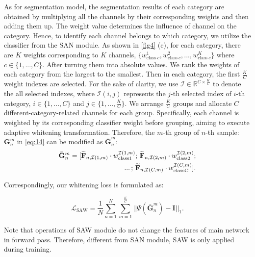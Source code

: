\documentclass[10pt,twocolumn,letterpaper]{article}
\begin{document}
As for segmentation model,  the segmentation results of each category are obtained by multiplying all the channels by their corresponding weights and then adding them up. The weight value determines the influence of channel on the category. Hence, to identify each channel belongs to which category, we utilize the classifier from the SAN module. As shown in \cref{fig4} (c), for each category, there are $K$ weights corresponding to $K$ channels, \ie $\{w_{\mathrm{class}~c}^{1},w_{\mathrm{class}~c}^{2},...,w_{\mathrm{class}~c}^{K}\}$ where $c\in\{1,...,C\}$. After turning them into absolute values. We rank the weights of each category from the largest to the smallest. Then in each category, the first $\frac{K}{C}$ weight indexes are selected. For the sake of clarity, we use $\mathcal{I}\in\mathbb{R}^{C\times\frac{K}{C}}$ to denote the all selected indexes, where $\mathcal{I}(i,j)$ represents the $j$-th selected index of $i$-th category, $i\in\{1,...,C\}$ and $j\in\{1,...,\frac{K}{C}\}$. We arrange $\frac{K}{C}$ groups and allocate $C$ different-category-related channels for each group. Specifically, each channel is weighted by its corresponding classifier weight before grouping, aiming to execute adaptive whitening transformation. Therefore, the $m$-th group of $n$-th sample: $\mathbf{G}_{n}^{m}$ in \cref{eq:14} can be modified as $\mathbf{\bar{G}}_{n}^{m}$:
\vspace{-0.8mm}
\begin{equation}
\begin{split}\mathbf{\bar{G}}_{n}^{m}=[\mathbf{\widetilde{F}}_{n,\mathcal{I}(1,m)}\cdot w_{\mathrm{class1}}^{\mathcal{I}(1,m)};\thinspace\mathbf{\widetilde{F}}_{n,\mathcal{I}(2,m)}\cdot w_{\mathrm{class2}}^{\mathcal{I}(2,m)};\\
...\thinspace;\thinspace\mathbf{\widetilde{F}}_{n,\mathcal{I}(C,m)}\cdot w_{\mathrm{classC}}^{\mathcal{I}(C,m)}].
\end{split}
\end{equation}

\noindent Correspondingly, our whitening loss is formulated as:
\vspace{-1.2mm}

\begin{equation}
\mathcal{L}_{\mathrm{SAW}}=\frac{1}{N}\sum_{n=1}^{N}\sum_{m=1}^{\frac{K}{C}}||\Psi(\mathbf{\bar{G}}_{n}^{m})-\mathbf{I}||_{1}.
\end{equation}


Note that operations of SAW module do not change the features of main network in forward pass. Therefore, different from SAN module, SAW is only applied during training.
\end{document}
